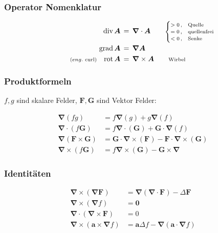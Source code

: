 \documentclass[titlepage,11pt,a4paper,ngerman]{report}
\renewcommand{\vec}[1]{\bm{#1}}
\newcommand{\vabla}{\vec{\nabla}}
\renewcommand{\paragraph}[1]{\subsubsection{#1}}
\begin{document}
\paragraph{Operator Nomenklatur}
\begin{align*}
\text{div}\, \vec{A} \, &= \, \vec{\nabla}\cdot \vec{A} \qquad \rlap{\scriptsize{$\begin{cases} 
		>0 \, , & \mathrm{Quelle} \\
		=0 \, , & \mathrm{quellenfrei}\\
		<0\, , & \mathrm{Senke}
	\end{cases}$}} \\
\text{grad}\,\vec{A} \, &= \, \vec{\nabla}\vec{A} \\
\llap{\scriptsize{($eng.$ curl)}} \quad \text{rot}\, \vec{A} \, &= \, \vec{\nabla}\times \vec{A} \qquad \rlap{\scriptsize{Wirbel}}
\end{align*}

\paragraph{Produktformeln}
$f, g$ sind skalare Felder, $\vec{F}, \vec{G}$ sind Vektor Felder:

\begin{align*}
 	\vabla(fg) &= f \vabla (g) + g \vabla (f)\\
 	\vabla \cdot (f \vec{G}) &= f \vabla \cdot (\vec{G}) + \vec{G} \cdot \vabla (f)\\
 	\vabla (\vec{F} \times \vec{G}) &= \vec{G} \cdot \vabla \times (\vec{F}) - \vec{F} \cdot \vabla \times (\vec{G})\\
 	\vabla \times (f \vec{G}) &= f \vabla \times (\vec{G}) - \vec{G} \times \vabla
\end{align*}

\paragraph{Identitäten}

\begin{align*}
	\vec{\nabla}\times(\vec{\nabla}\vec{F})&=\vec{\nabla}(\vec{\nabla}\cdot\vec{F})-\Delta\vec{F}\\
	\vec{\nabla}\times(\vec{\nabla}f)&=\vec{0}\\
	\vec{\nabla}\cdot(\vec{\nabla}\times\vec{F})&=0\\
	\vec{\nabla}\times(\vec{a}\times\vec{\nabla}f)&=\vec{a}\Delta f-\vec{\nabla}(\vec{a}\cdot\vec{\nabla}f)
\end{align*}
\end{document}
